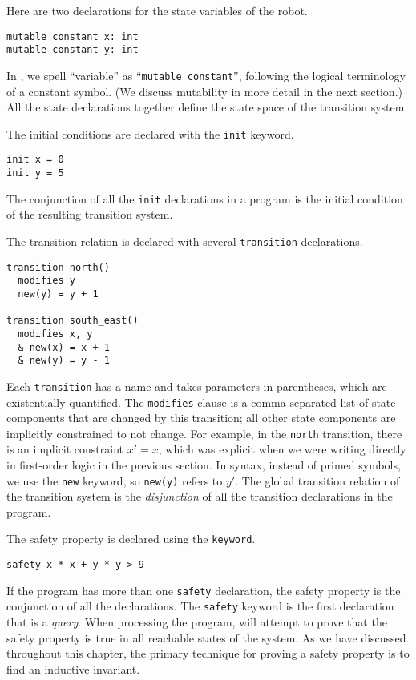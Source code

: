 Here are two declarations for the state variables of the robot.%
\begin{lstlisting}[language=mypyvy, xleftmargin=.2\textwidth, xrightmargin=.2\textwidth]
mutable constant x: int
mutable constant y: int
\end{lstlisting}
In \mypyvy, we spell ``variable'' as ``\lstinline[language=mypyvy]{mutable constant}'', 
  following the logical terminology of a constant symbol.
(We discuss mutability in more detail in the next section.)
All the state declarations together
  define the state space of the transition system.

The initial conditions are declared with the \lstinline[language=mypyvy]{init} keyword.
\begin{lstlisting}[language=mypyvy, xleftmargin=.2\textwidth, xrightmargin=.2\textwidth]
init x = 0 
init y = 5
\end{lstlisting}
The conjunction of all the \lstinline[language=mypyvy]{init} declarations in a \mypyvy program 
  is the initial condition of the resulting transition system.
  
The transition relation is declared 
  with several \lstinline[language=mypyvy]{transition} declarations.
\begin{lstlisting}[language=mypyvy, xleftmargin=.2\textwidth, xrightmargin=.2\textwidth]
transition north()
  modifies y
  new(y) = y + 1

transition south_east()
  modifies x, y
  & new(x) = x + 1
  & new(y) = y - 1
\end{lstlisting}
Each \lstinline[language=mypyvy]{transition} has a name and takes parameters in parentheses, 
  which are existentially quantified.
The \lstinline[language=mypyvy]{modifies} clause is a comma-separated list of state components 
  that are changed by this transition;
  all other state components are implicitly constrained to not change.
For example, in the \lstinline[language=mypyvy]{north} transition, 
  there is an implicit constraint $x' = x$, 
  which was explicit when we were writing directly in first-order logic
  in the previous section.
In \mypyvy syntax, instead of primed symbols, 
  we use the \lstinline[language=mypyvy]{new} keyword,
  so \lstinline[language=mypyvy]{new(y)} refers to $y'$.
The global transition relation of the transition system is 
  the \emph{disjunction} of all the transition declarations in the program.

The safety property is declared using the \lstinline[language=mypyvy]{keyword}.
\begin{lstlisting}[language=mypyvy, xleftmargin=.2\textwidth, xrightmargin=.2\textwidth]
safety x * x + y * y > 9
\end{lstlisting}
If the program has more than one \lstinline[language=mypyvy]{safety} declaration, 
  the safety property is the conjunction of all the declarations.
The \lstinline[language=mypyvy]{safety} keyword is the first declaration 
  that is a \emph{query}. 
When processing the program, \mypyvy will attempt to prove that 
  the safety property is true in all reachable states of the system.
As we have discussed throughout this chapter, 
  the primary technique for proving a safety property is 
  to find an inductive invariant.


